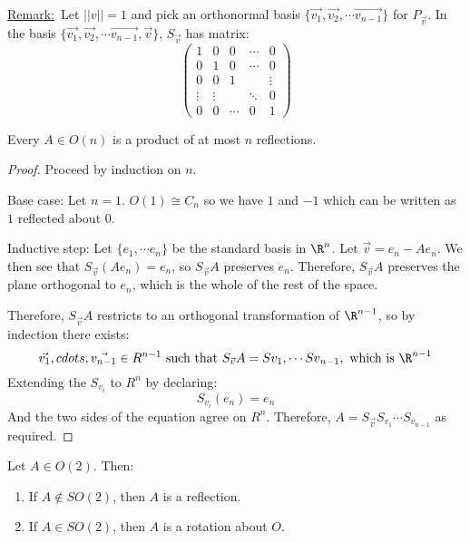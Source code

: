 \documentclass[../Main.tex]{subfiles}
\begin{document}
\underline{Remark:}~Let $||v|| = 1$ and pick an orthonormal basis $\{\vec{v_1}, \vec{v_2}, \cdots \vec{v_{n-1}}\}$ for $P_{\vec{v}}$. In the basis $\{\vec{v_1}, \vec{v_2}, \cdots \vec{v_{n-1}}, \vec{v}\}$, $S_{\vec{v}}$ has matrix:
\begin{equation*}
    \begin{pmatrix}
        1 & 0 & 0 & \cdots & 0 \\
        0 & 1 & 0 & \cdots & 0 \\
        0 & 0 & 1 & & \vdots \\
        \vdots & \vdots & & \ddots & 0 \\
        0 & 0 & \cdots & 0 & 1
    \end{pmatrix}
\end{equation*}
\begin{theorem}
    Every $A \in O(n)$ is a product of at most $n$ reflections.
\end{theorem}
\begin{proof}
    Proceed by induction on $n$.\par
    Base case: Let $n = 1$. $O(1) \cong C_n$ so we have $1$ and $-1$ which can be written as $1$ reflected about $0$.\par
    Inductive step: Let $\{e_1, \cdots e_n\}$ be the standard basis in $\R^n$. Let $\vec{v} = e_n - Ae_n$. We then see that $S_{\vec{v}}(Ae_n) = e_n$, so $S_{\vec{v}} A$ preserves $e_n$. Therefore, $S_{\vec{v}} A$ preserves the plane orthogonal to $e_n$, which is the whole of the rest of the space.\par
    Therefore, $S_{\vec{v}} A$ restricts to an orthogonal transformation of $\R^{n-1}$, so by indection there exists:
    \begin{equation*}
        \vec{v_1}, cdots, \vec{v_{n-1}} \in R^{n-1} \text{ such that } S_{\vec{v}} A = Sv_1, \cdots Sv_{n-1}, \text{ which is } \R^{n-1}
    \end{equation*}
    Extending the $S_{v_i}$ to $R^n$ by declaring:
    \begin{equation*}
        S_{v_i}(e_n) = e_n
    \end{equation*}
    And the two sides of the equation agree on $R^n$. Therefore, $A = S_{\vec{v}} S_{v_1} \cdots S_{v_{n-1}}$ as required.
\end{proof}
\begin{lemma}[Elements of $O(2)$]
    Let $A \in O(2)$. Then:
    \begin{enumerate}
        \item If $A \notin SO(2)$, then $A$ is a reflection.
        \item If $A \in SO(2)$, then $A$ is a rotation about $O$.
    \end{enumerate}
\end{lemma}
\end{document}
